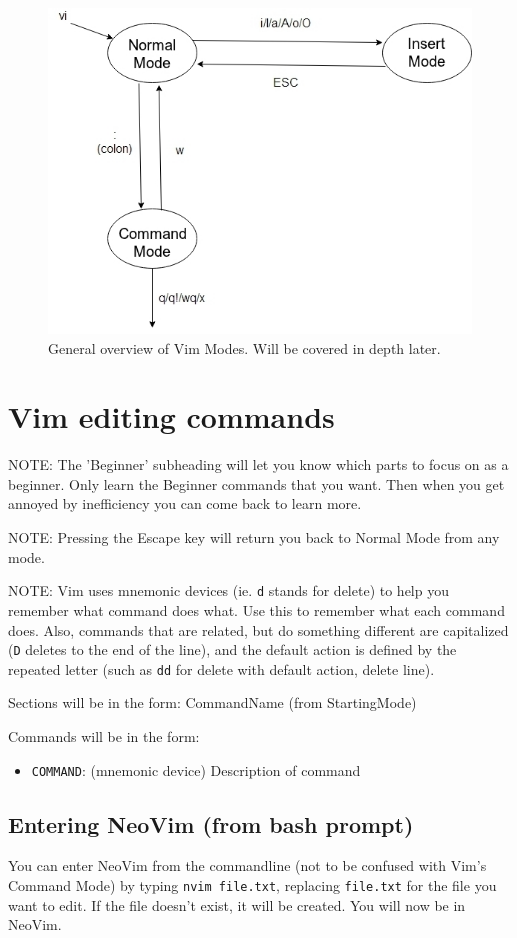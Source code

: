 \documentclass[11pt]{article}
\begin{document}
\begin{figure}[htbp]
\centering
\includegraphics[width=.9\linewidth]{./modes.jpg}
\caption{\label{fig:orga05731e}
General overview of Vim Modes. Will be covered in depth later.}
\end{figure}
\section{Vim editing commands}
\label{sec:org8fd7cdc}
NOTE: The 'Beginner' subheading will let you know which parts to focus on as a
beginner. Only learn the Beginner commands that you want. Then when you get
annoyed by inefficiency you can come back to learn more.

NOTE: Pressing the Escape key will return you back to Normal Mode from any mode.

NOTE: Vim uses mnemonic devices (ie. \texttt{d} stands for delete) to help you remember
what command does what. Use this to remember what each command does. Also,
commands that are related, but do something different are capitalized (\texttt{D}
deletes to the end of the line), and the default action is defined by the
repeated letter (such as \texttt{dd} for delete with default action, delete line).

Sections will be in the form: CommandName (from StartingMode)

Commands will be in the form:
\begin{itemize}
\item \texttt{COMMAND}: (mnemonic device) Description of command
\end{itemize}
\subsection{Entering NeoVim (from bash prompt)}
\label{sec:org8d7c63e}
You can enter NeoVim from the commandline (not to be confused with Vim's Command
Mode) by typing \texttt{nvim file.txt}, replacing \texttt{file.txt} for the file you want to
edit. If the file doesn't exist, it will be created. You will now be in NeoVim.
\end{document}
